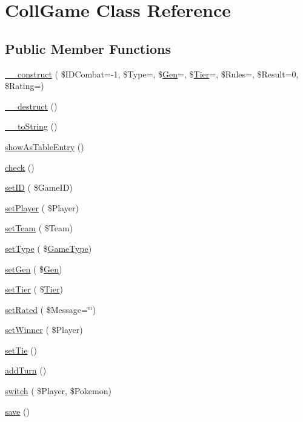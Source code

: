\hypertarget{class_coll_game}{}\section{Coll\+Game Class Reference}
\label{class_coll_game}
\subsection*{Public Member Functions}
\begin{DoxyCompactItemize}
\item 
\hyperlink{class_coll_game_a4e0b87158815fece62aeb905f8b422bf}{\+\_\+\+\_\+construct} ( \$I\+D\+Combat=-\/1, \$Type=\textquotesingle{}\textquotesingle{}, \$\hyperlink{class_gen}{Gen}=\textquotesingle{}\textquotesingle{}, \$\hyperlink{class_tier}{Tier}=\textquotesingle{}\textquotesingle{}, \$Rules=\textquotesingle{}\textquotesingle{}, \$Result=0, \$Rating=\textquotesingle{}\textquotesingle{})
\item 
\hyperlink{class_coll_game_aa97b1484a6cab9ad7acdf2a344b2fde7}{\+\_\+\+\_\+destruct} ()
\item 
\hyperlink{class_coll_game_a5ff4e16aeaa7229cde0ccae3ab4c1491}{\+\_\+\+\_\+to\+String} ()
\item 
\hyperlink{class_coll_game_ade12acdf0b275118160e3744e8097316}{show\+As\+Table\+Entry} ()
\item 
\hyperlink{class_coll_game_a3230ec46cb3b4e446ecbdd7d1493d688}{check} ()
\item 
\hyperlink{class_coll_game_a8067b272ef9f022c531344e2a855648d}{set\+ID} ( \$Game\+ID)
\item 
\hyperlink{class_coll_game_a59f8a0778646e4a875e14613e98ae4d7}{set\+Player} ( \$Player)
\item 
\hyperlink{class_coll_game_a3315437cf82b30e45df190b39522d9a1}{set\+Team} ( \$Team)
\item 
\hyperlink{class_coll_game_ae855d409619a2c4393b68a5b5b500a44}{set\+Type} ( \$\hyperlink{class_game_type}{Game\+Type})
\item 
\hyperlink{class_coll_game_a6b4d0f6fc49965d0588f4b5399a4fc4e}{set\+Gen} ( \$\hyperlink{class_gen}{Gen})
\item 
\hyperlink{class_coll_game_a34dbe12abb0ff79f921443ebf8d5f52a}{set\+Tier} ( \$\hyperlink{class_tier}{Tier})
\item 
\hyperlink{class_coll_game_a66a1e8f3c025110296b6cff7987e98a0}{set\+Rated} ( \$Message=\char`\"{}\char`\"{})
\item 
\hyperlink{class_coll_game_af53c04d2c5319ec17eb544f43eb0fa8f}{set\+Winner} ( \$Player)
\item 
\hyperlink{class_coll_game_a0a11d0075a6f3cd099813e7df7e0bfdb}{set\+Tie} ()
\item 
\hyperlink{class_coll_game_a836082d38e7b85dcbb23407784ddfa94}{add\+Turn} ()
\item 
\hyperlink{class_coll_game_aff51031bafd64d31e6799b9afd8ad340}{switch} ( \$Player, \$Pokemon)
\item 
\hyperlink{class_coll_game_a5a48c2bf061280bf901567acf9e6b131}{save} ()
\end{DoxyCompactItemize}

